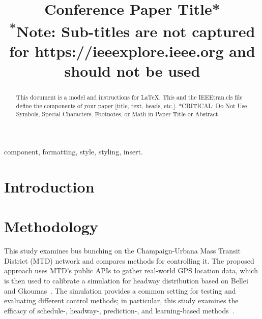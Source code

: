 \documentclass[conference]{IEEEtran}
\begin{document}
\title{
  Conference Paper Title*\\
  {\footnotesize \textsuperscript{*}Note: Sub-titles are not captured for
    https://ieeexplore.ieee.org  and should not be used}
}

\author{
  \and {}
  \and {}
  \and {}
}

\maketitle

\begin{abstract}
  This document is a model and instructions for \LaTeX.
  This and the IEEEtran.cls file define the components of your paper [title, text, heads, etc.].
  *CRITICAL: Do Not Use Symbols, Special Characters, Footnotes, or Math in Paper Title or Abstract.
\end{abstract}

\begin{IEEEkeywords}
  component, formatting, style, styling, insert.
\end{IEEEkeywords}

\section{Introduction}

\section{Methodology}

This study examines bus bunching on the Champaign-Urbana Mass Transit District (MTD) network and compares methods for controlling it.
The proposed approach uses MTD's public APIs to gather real-world GPS location data, which is then used to calibrate a simulation for headway distribution based on Bellei and Gkoumas~\cite{bellei2010}.
The simulation provides a common setting for testing and evaluating different control methods;
in particular, this study examines the efficacy of schedule-, headway-, prediction-, and learning-based methods~\cite{berrebi2018holding}\cite{rodriguez2023}.
\end{document}
